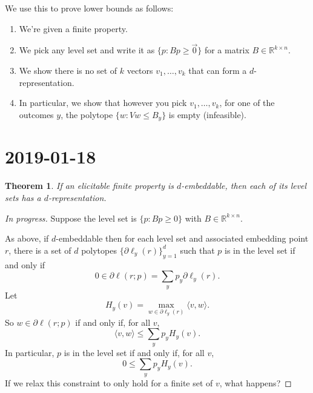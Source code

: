\documentclass[12pt]{article}
\newtheorem{theorem}{Theorem}
\theoremstyle{definition}
\newcommand{\reals}{\mathbb{R}}
\begin{document}
We use this to prove lower bounds as follows:
\begin{enumerate}
  \item We're given a finite property.
  \item We pick any level set and write it as $\{ p : Bp \geq \vec{0}\}$ for a matrix $B \in \reals^{k \times n}$.
  \item We show there is no set of $k$ vectors $v_1,\dots,v_k$ that can form a $d$-representation.
  \item In particular, we show that however you pick $v_1,\dots,v_k$, for one of the outcomes $y$, the polytope $\{w : Vw \leq B_y \}$ is empty (infeasible).
\end{enumerate}


\break

\section{2019-01-18}

\begin{theorem}
  If an elicitable finite property is $d$-embeddable, then each of its level sets has a $d$-representation.
\end{theorem}
\begin{proof}
  [In progress]
  Suppose the level set is $\{p : Bp \geq 0\}$ with $B \in \reals^{k \times n}$.
  
  As above, if $d$-embeddable then for each level set and associated embedding point $r$, there is a set of $d$ polytopes $\{\partial \ell_y(r)\}_{y=1}^d$ such that $p$ is in the level set if and only if
  \[ 0 \in \partial \ell(r;p) = \sum_y p_y \partial \ell_y(r) . \]
  Let
    \[ H_y(v) = \max_{w \in \partial \ell_y(r)} \langle v , w \rangle . \]
  So $w \in \partial \ell(r;p)$ if and only if, for all $v$,
    \[ \langle v, w\rangle \leq \sum_y p_y H_y(v) . \]
  In particular, $p$ is in the level set if and only if, for all $v$,
    \[ 0 \leq \sum_y p_y H_y(v) . \]
  If we relax this constraint to only hold for a finite set of $v$, what happens?
\end{proof}
  
\end{document}
